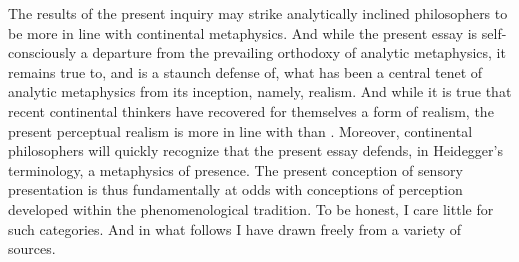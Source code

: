 The results of the present inquiry may strike analytically inclined philosophers to be more in line with continental metaphysics. And while the present essay is self-consciously a departure from the prevailing orthodoxy of analytic metaphysics, it remains true to, and is a staunch defense of, what has been a central tenet of analytic metaphysics from its inception, namely, realism. And while it is true that recent continental thinkers have recovered for themselves a form of realism, the present perceptual realism is more in line with \citet{Cook-Wilson:1926sf} than \citet{Meillassoux:2008ve}. Moreover, continental philosophers will quickly recognize that the present essay defends, in Heidegger's terminology, a metaphysics of presence. The present conception of sensory presentation is thus fundamentally at odds with conceptions of perception developed within the phenomenological tradition. To be honest, I care little for such categories. And in what follows I have drawn freely from a variety of sources.








